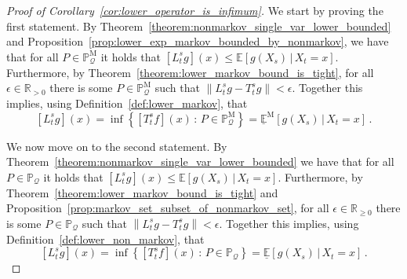 \documentclass[10pt]{paper}
\theoremstyle{definition}
\newcommand{\reals}{\mathbb{R}}
\newcommand{\realspos}{\reals_{>0}}
\newcommand{\realsnonneg}{\reals_{\geq 0}}
\newcommand{\processes}{\mathbb{P}}
\newcommand{\mprocesses}{\processes^{\mathrm{M}}}
\newcommand{\rateset}{\mathcal{Q}}
\newcommand{\norm}[1]{\left\lVert #1 \right\rVert}
\begin{document}
\begin{proof}[Proof of Corollary~\ref{cor:lower_operator_is_infimum}]
We start by proving the first statement. By Theorem~\ref{theorem:nonmarkov_single_var_lower_bounded} and Proposition~\ref{prop:lower_exp_markov_bounded_by_nonmarkov}, we have that for all $P\in\mprocesses_\rateset$ it holds that $\left[L_t^sg\right](x) \leq \mathbb{E}[g(X_s)\,\vert\,X_t=x]$. Furthermore, by Theorem~\ref{theorem:lower_markov_bound_is_tight}, for all $\epsilon\in\realspos$ there is some $P\in\mprocesses_\rateset$ such that $\norm{L_t^sg - T_t^sg} < \epsilon$. Together this implies, using Definition~\ref{def:lower_markov}, that
\begin{equation*}
\left[L_t^sg\right](x) = \inf\left\{\left[T_t^sf\right](x)\,:\,P\in\mprocesses_\rateset\right\} = \underline{\mathbb{E}}^{\mathrm{M}}\left[g(X_s)\,\vert\,X_t=x\right]\,.
\end{equation*}

We now move on to the second statement. By Theorem~\ref{theorem:nonmarkov_single_var_lower_bounded} we have that for all $P\in\processes_\rateset$ it holds that $\left[L_t^sg\right](x) \leq \mathbb{E}[g(X_s)\,\vert\,X_t=x]$.
Furthermore, by Theorem~\ref{theorem:lower_markov_bound_is_tight} and Proposition~\ref{prop:markov_set_subset_of_nonmarkov_set}, for all $\epsilon\in\realsnonneg$ there is some $P\in\processes_\rateset$ such that
$\norm{L_t^sg - T_t^sg} < \epsilon$.
Together this implies, using Definition~\ref{def:lower_non_markov}, that
\begin{equation*}
\left[L_t^sg\right](x) = \inf\left\{\left[T_t^sf\right](x)\,:\,P\in\processes_\rateset\right\} = \underline{\mathbb{E}}\left[g(X_s)\,\vert\,X_t=x\right]\,.
\end{equation*}
\end{proof}
\end{document}
